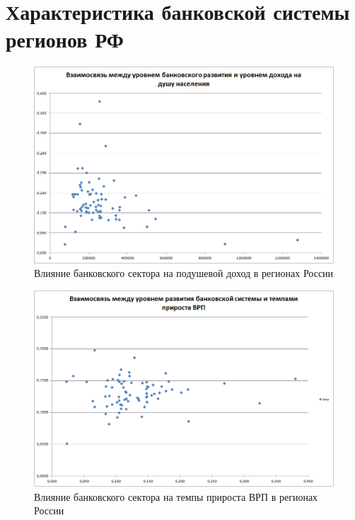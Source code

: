 	
\chapter{{Характеристика банковской системы регионов РФ}}
\begin{figure}[H]
	\centering
	\includegraphics [width=0.5\linewidth]{1}
	\caption{ Влияние банковского сектора на подушевой доход в регионах России }\label{ris:02:01}
\end{figure}
\begin{figure}[H]
	\centering
	\includegraphics [width=0.5\linewidth]{2}
	\caption{ Влияние банковского сектора на темпы прироста ВРП в регионах России }\label{ris:02:02}
\end{figure}
